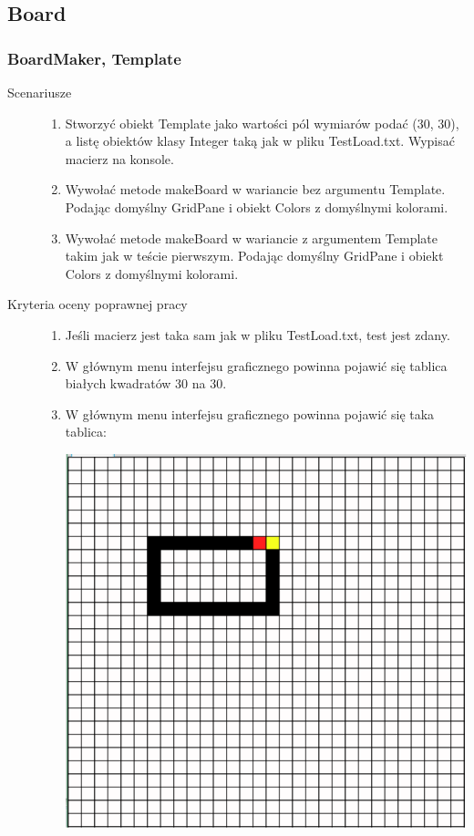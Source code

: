 \documentclass[a4paper,11pt]{article}
\begin{document}
\subsection{Board}
\subsubsection{BoardMaker, Template}
\begin{description}

\item[Scenariusze] \hfill
\begin{enumerate}
\item Stworzyć obiekt Template jako wartości pól wymiarów podać (30, 30), a listę obiektów klasy Integer taką jak w pliku TestLoad.txt. Wypisać macierz na konsole.
\item Wywołać metode makeBoard w wariancie bez argumentu Template. Podając domyślny GridPane i obiekt Colors z domyślnymi kolorami.
\item Wywołać metode makeBoard w wariancie z argumentem Template takim jak w teście pierwszym. Podając domyślny GridPane i obiekt Colors z domyślnymi kolorami.

\end{enumerate}

\item[Kryteria oceny poprawnej pracy] \hfill
\begin{enumerate}
\item Jeśli macierz jest taka sam jak w pliku TestLoad.txt, test jest zdany.
\item W głównym menu interfejsu graficznego powinna pojawić się tablica białych kwadratów 30 na 30.
\item W głównym menu interfejsu graficznego powinna pojawić się taka tablica:

\includegraphics[width=\textwidth]{TestGUI2}
\end{enumerate}

\end{description}
\end{document}
